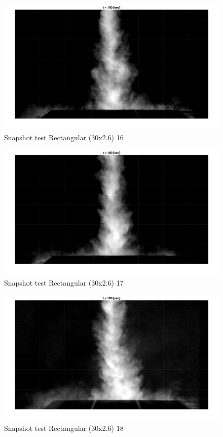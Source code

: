 \begin{figure}[ht!]
    \centering
    \includegraphics[width=\linewidth]{Images/Rec30_16_t100.jpg}
    \caption{Snapshot test Rectangular (30x2.6) 16}
\end{figure}

\begin{figure}[ht!]
    \centering
    \includegraphics[width=\linewidth]{Images/Rec30_17_t100.jpg}
    \caption{Snapshot test Rectangular (30x2.6) 17}
\end{figure}

\begin{figure}[ht!]
    \centering
    \includegraphics[width=\linewidth]{Images/Rec30_18_t100.jpg}
    \caption{Snapshot test Rectangular (30x2.6) 18}
\end{figure}

